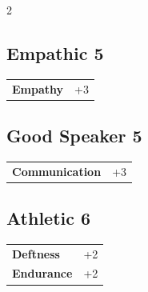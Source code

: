\begin{multicols}{2}
\begin{tcolorbox}
\end{tcolorbox}

\begin{tcolorbox}
    \subsection*{Empathic \hfill \small{5 }}
    \tcblower




\begin{tabular}{@{}ll@{}}
    \textbf{Empathy} & +3\\
\end{tabular}


\end{tcolorbox}

\begin{tcolorbox}
    \subsection*{Good Speaker \hfill \small{5 }}
    \tcblower




\begin{tabular}{@{}ll@{}}
    \textbf{Communication} & +3\\
\end{tabular}


\end{tcolorbox}

\begin{tcolorbox}
    \subsection*{Athletic \hfill \small{6 }}
    \tcblower




\begin{tabular}{@{}ll@{}}
    \textbf{Deftness} & +2\\
    \textbf{Endurance} & +2\\
\end{tabular}



\end{tcolorbox}
\end{multicols}
